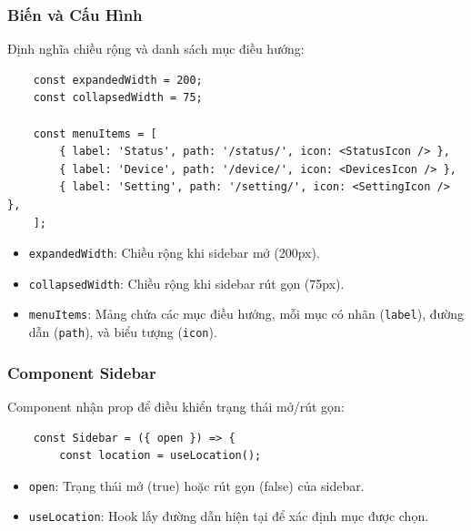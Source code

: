             \subsubsection{Biến và Cấu Hình}
                \hspace*{0.6cm}Định nghĩa chiều rộng và danh sách mục điều hướng:
                \begin{lstlisting}
    const expandedWidth = 200;
    const collapsedWidth = 75;

    const menuItems = [
        { label: 'Status', path: '/status/', icon: <StatusIcon /> },
        { label: 'Device', path: '/device/', icon: <DevicesIcon /> },
        { label: 'Setting', path: '/setting/', icon: <SettingIcon /> },
    ];
                \end{lstlisting}
                \begin{itemize}
                    \item \texttt{expandedWidth}: Chiều rộng khi sidebar mở (200px).
                    \item \texttt{collapsedWidth}: Chiều rộng khi sidebar rút gọn (75px).
                    \item \texttt{menuItems}: Mảng chứa các mục điều hướng, mỗi mục có nhãn (\texttt{label}), đường dẫn (\texttt{path}), và biểu tượng (\texttt{icon}).
                \end{itemize}

            \subsubsection{Component Sidebar}
                \hspace*{0.6cm}Component nhận prop để điều khiển trạng thái mở/rút gọn:
                \begin{lstlisting}
    const Sidebar = ({ open }) => {
        const location = useLocation();
                \end{lstlisting}
                \begin{itemize}
                    \item \texttt{open}: Trạng thái mở (true) hoặc rút gọn (false) của sidebar.
                    \item \texttt{useLocation}: Hook lấy đường dẫn hiện tại để xác định mục được chọn.
                \end{itemize}

